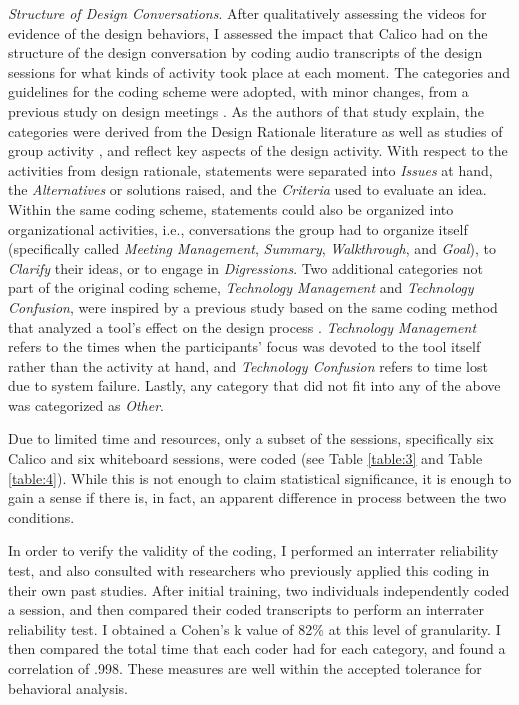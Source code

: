     \emph{Structure of Design Conversations}. After qualitatively assessing the videos for evidence of the design behaviors, I assessed the impact that Calico had on the structure of the design conversation by coding audio transcripts of the design sessions for what kinds of activity took place at each moment. The categories and guidelines for the coding scheme were adopted, with minor changes, from a previous study on design meetings \citep{Olson}. As the authors of that study explain, the categories were derived from the Design Rationale literature \citep{Moran} as well as studies of group activity \citep{PUTNAM}, and reflect key aspects of the design activity. With respect to the activities from design rationale, statements were separated into \emph{Issues} at hand, the \emph{Alternatives} or solutions raised, and the \emph{Criteria} used to evaluate an idea. Within the same coding scheme, statements could also be organized into organizational activities, i.e., conversations the group had to organize itself (specifically called \emph{Meeting Management}, \emph{Summary}, \emph{Walkthrough}, and \emph{Goal}), to \emph{Clarify} their ideas, or to engage in \emph{Digressions}. Two additional categories not part of the original coding scheme, \emph{Technology Management} and \emph{Technology Confusion}, were inspired by a previous study based on the same coding method that analyzed a tool's effect on the design process \citep{Olsonb}. \emph{Technology Management} refers to the times when the participants' focus was devoted to the tool itself rather than the activity at hand, and \emph{Technology Confusion} refers to time lost due to system failure. Lastly, any category that did not fit into any of the above was categorized as \emph{Other}. 

Due to limited time and resources, only a subset of the sessions, specifically six Calico and six whiteboard sessions, were coded (see Table \ref{table:3} and Table \ref{table:4}). While this is not enough to claim statistical significance, it is enough to gain a sense if there is, in fact, an apparent difference in process between the two conditions.

In order to verify the validity of the coding, I performed an interrater reliability test, and also consulted with researchers who previously applied this coding in their own past studies. After initial training, two individuals independently coded a session, and then compared their coded transcripts to perform an interrater reliability test. I obtained a Cohen's k value of 82\% at this level of granularity. I then compared the total time that each coder had for each category, and found a correlation of .998. These measures are well within the accepted tolerance for behavioral analysis.

